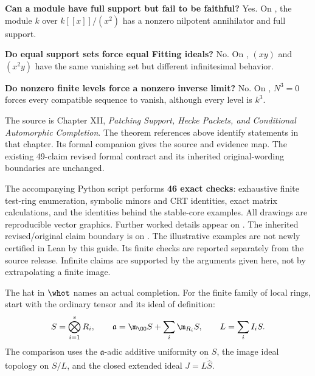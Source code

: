 \textbf{Can a module have full support but fail to be faithful?} Yes. On , the module $k$ over $k[[x]]/(x^2)$ has a nonzero nilpotent annihilator and full support.

\textbf{Do equal support sets force equal Fitting ideals?} No. On , $(xy)$ and $(x^2y)$ have the same vanishing set but different infinitesimal behavior.

\textbf{Do nonzero finite levels force a nonzero inverse limit?} No. On , $N^3=0$ forces every compatible sequence to vanish, although every level is $k^3$.

The source is Chapter XII, \emph{Patching Support, Hecke Packets, and Conditional Automorphic Completion}. The theorem references above identify statements in that chapter. Its formal companion gives the source and evidence map. The existing 49-claim revised formal contract and its inherited original-wording boundaries are unchanged.

The accompanying Python script performs \textbf{46 exact checks}: exhaustive finite test-ring enumeration, symbolic minors and CRT identities, exact matrix calculations, and the identities behind the stable-core examples. All drawings are reproducible vector graphics. Further worked details appear on . The inherited revised/original claim boundary is on . The illustrative examples are not newly certified in Lean by this guide. Its finite checks are reported separately from the source release. Infinite claims are supported by the arguments given here, not by extrapolating a finite image.

\setlength{\parskip}{5pt}
The hat in $\whot$ names an actual completion. For the finite family of local rings, start with the ordinary tensor and its ideal of definition:
\[
 S=\bigotimes_{i=1}^s R_i,\qquad
 \mathfrak a=\m_{\OO}S+\sum_i\m_{R_i}S,\qquad L=\sum_i I_iS.
\]
The comparison uses the $\mathfrak a$-adic additive uniformity on $S$, the image ideal topology on $S/L$, and the closed extended ideal $J=\overline{L\widehat S}$.


